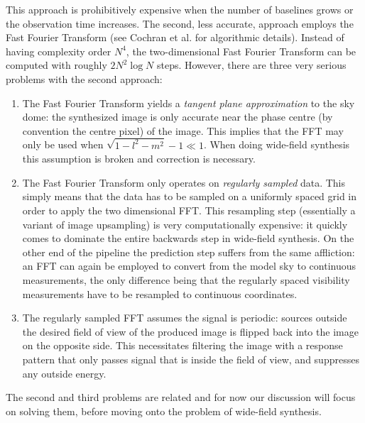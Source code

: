  This approach is prohibitively expensive when the number of baselines grows or the observation time increases. The second, less accurate, approach employs 
 the Fast Fourier Transform (see Cochran et al. \cite{cochran1967fast} for algorithmic details). Instead of having complexity order $N^4$, the two-dimensional Fast Fourier 
 Transform can be computed with roughly $2N^2\log{N}$ steps. However, there are three very serious problems with the second approach:
 \begin{enumerate}
  \item The Fast Fourier Transform yields a \emph{tangent plane approximation} to the sky dome: the synthesized image is only accurate near the phase centre (by convention the centre pixel) of the image.
        This implies that the FFT may only be used when $\sqrt{1-l^2-m^2} - 1 \ll 1$. When doing wide-field synthesis this assumption is broken and correction is necessary.
  \item The Fast Fourier Transform only operates on \emph{regularly sampled} data. This simply means that the data has to be sampled on a uniformly spaced grid in order to 
	apply the two dimensional FFT. This resampling step (essentially a variant of image upsampling) is very computationally expensive: it quickly comes to 
	dominate the entire backwards step in wide-field synthesis. On the other end of the pipeline the prediction step suffers from the same affliction: an FFT can again be employed to convert
	from the model sky to continuous measurements, the only difference being that the regularly spaced visibility measurements have to be resampled to continuous coordinates.
  \item The regularly sampled FFT assumes the signal is periodic: sources outside the desired field of view of the produced image is flipped back into the image on the opposite side. 
	This necessitates filtering the image with a response pattern that only passes signal that is inside the field of view, and suppresses any outside energy.
 \end{enumerate}
 The second and third problems are related and for now our discussion will focus on solving them, before moving onto the problem of wide-field synthesis.
 
